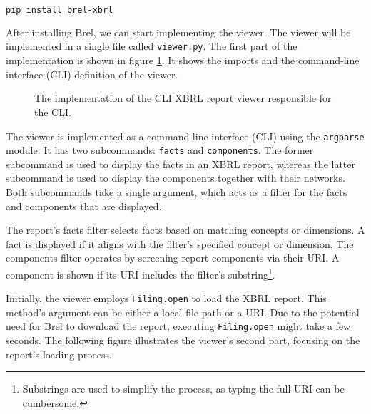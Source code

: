 \begin{lstlisting}[language=bash]
pip install brel-xbrl
\end{lstlisting}

After installing Brel, we can start implementing the viewer.
The viewer will be implemented in a single file called \texttt{viewer.py}.
The first part of the implementation is shown in figure \ref{fig:viewer_1}.
It shows the imports and the command-line interface (CLI) definition of the viewer.

\begin{figure}[H]
    \centering
    \caption{The implementation of the CLI XBRL report viewer responsible for the CLI.}
    \label{fig:viewer_1}
    
\end{figure}


The viewer is implemented as a command-line interface (CLI) using the \texttt{argparse} module.
It has two subcommands: \texttt{facts} and \texttt{components}.
The former subcommand is used to display the facts in an XBRL report, 
whereas the latter subcommand is used to display the components together with their networks.
Both subcommands take a single argument, which acts as a filter for the facts and components that are displayed.

The report's facts filter selects facts based on matching concepts or dimensions.
A fact is displayed if it aligns with the filter's specified concept or dimension.
The components filter operates by screening report components via their URI.
A component is shown if its URI includes the filter's substring\footnote{Substrings are used to simplify the process, as typing the full URI can be cumbersome.}.

Initially, the viewer employs \texttt{Filing.open} to load the XBRL report.
This method's argument can be either a local file path or a URI.
Due to the potential need for Brel to download the report, executing \texttt{Filing.open} might take a few seconds.
The following figure illustrates the viewer's second part, focusing on the report's loading process.

